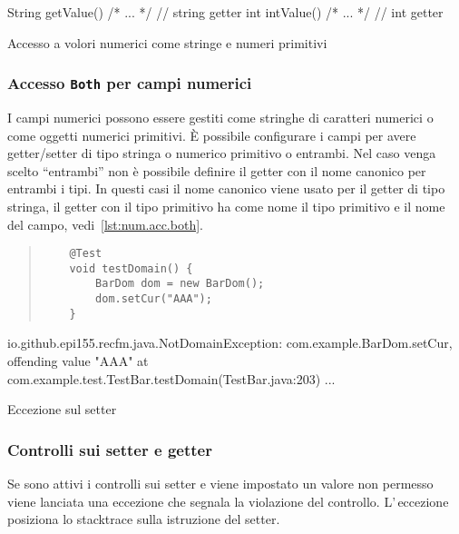 \begin{elisting}[!htb]
\begin{javacode}
    String getValue() { /* ... */ }   // string getter
    int intValue() { /* ... */ }      // int getter
\end{javacode}
\caption{Accesso a volori numerici come stringe e numeri primitivi}
\label{lst:num.acc.both}
\end{elisting}

\subsubsection*{Accesso \texttt{Both} per campi numerici}
I campi numerici possono essere gestiti come stringhe di caratteri numerici o
come oggetti numerici primitivi. È possibile configurare i campi per avere 
getter/setter di tipo stringa o numerico primitivo o entrambi.
Nel caso venga scelto ``entrambi'' non è possibile definire il getter con il
nome canonico per entrambi i tipi.
In questi casi il nome canonico viene usato per il getter di tipo stringa,
il getter con il tipo primitivo ha come nome il tipo primitivo e il nome del 
campo, vedi~\ref{lst:num.acc.both}.

\begin{elisting}[!htb]
\begin{quote}
\begin{verbatim}
    @Test
    void testDomain() {
        BarDom dom = new BarDom();
        dom.setCur("AAA");
    }
\end{verbatim}
\end{quote}
\vspace*{-1cm}
\begin{javacode}
io.github.epi155.recfm.java.NotDomainException: com.example.BarDom.setCur, offending value "AAA"
	at com.example.test.TestBar.testDomain(TestBar.java:203)
	...
\end{javacode}
\caption{Eccezione sul setter}
\label{lst:set.throw}
\end{elisting}

\subsubsection*{Controlli sui setter e getter}
Se sono attivi i controlli sui setter e viene impostato un valore non permesso 
viene lanciata una eccezione che segnala la violazione del controllo.
L'\,eccezione posiziona lo stacktrace sulla istruzione del setter.

